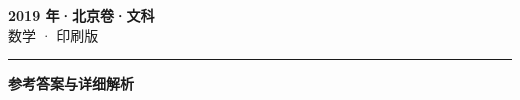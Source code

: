 \documentclass[zihao=5, a4paper]{ctexart}
\begin{document}
\begin{center}
  {\Large\bfseries 2019 年·北京卷·文科}\\[4pt]
  {\large 数学 · 印刷版}
\end{center}
\medskip
{}

\par\bigskip\hrule\bigskip
{}
\begin{center}{\large\bfseries 参考答案与详细解析}\end{center}
\smallskip

\end{document}
